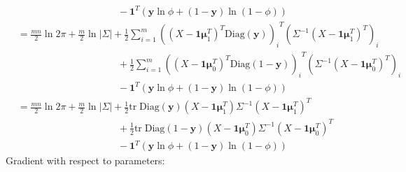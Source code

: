 \documentclass{article}
\renewcommand{\pmb}[1]{\boldsymbol{#1}}
\newcommand{\tr}{\text{tr}\;}
\begin{document}
\begin{align*}
	&\qquad\qquad\qquad\qquad\qquad\:\! - \pmb 1^T (\pmb y\ln\phi + (1 - \pmb y)\ln(1 - \phi)) \\ 
	&= \frac{mn}{2}\ln 2\pi + \frac{m}{2}\ln |\Sigma| + \frac{1}{2} \sum_{i=1}^m { ((X - \pmb 1 \pmb\mu_1^T)^T \text{Diag}(\pmb y)  )_i }^T (\Sigma^{-1} (X - \pmb 1 \pmb\mu_1^T)^T )_i \\ 
	&\qquad\qquad\qquad\qquad\qquad\:\! +\frac{1}{2} \sum_{i=1}^m { ((X - \pmb 1 \pmb\mu_0^T)^T \text{Diag}(1 - \pmb y) )_i }^T (\Sigma^{-1} (X - \pmb 1 \pmb\mu_0^T)^T )_i \\ 
	&\qquad\qquad\qquad\qquad\qquad\:\! - \pmb 1^T (\pmb y\ln\phi + (1 - \pmb y)\ln(1 - \phi)) \\ 
	&= \frac{mn}{2}\ln 2\pi + \frac{m}{2}\ln |\Sigma| + \frac{1}{2}  \tr \text{Diag}(\pmb y) (X - \pmb 1 \pmb\mu_1^T) \Sigma^{-1} (X - \pmb 1\pmb\mu_1^T)^T \\ 
	&\qquad\qquad\qquad\qquad\qquad\:\! +\frac{1}{2} \tr \text{Diag}(1 - \pmb y) (X - \pmb 1 \pmb\mu_0^T) \Sigma^{-1} (X - \pmb 1 \pmb\mu_0^T)^T  \\ 
	&\qquad\qquad\qquad\qquad\qquad\:\! - \pmb 1^T (\pmb y\ln\phi + (1 - \pmb y)\ln(1 - \phi))
\end{align*}
Gradient with respect to parameters:
\end{document}
